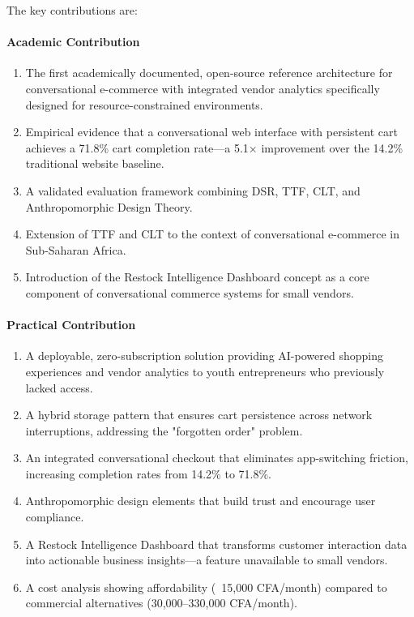 \documentclass[12pt,a4paper]{article}
\begin{document}
The key contributions are:

\paragraph{Academic Contribution}

\begin{enumerate}
    \item The first academically documented, open-source reference architecture for conversational e-commerce with integrated vendor analytics specifically designed for resource-constrained environments.
    \item Empirical evidence that a conversational web interface with persistent cart achieves a 71.8\% cart completion rate---a 5.1× improvement over the 14.2\% traditional website baseline.
    \item A validated evaluation framework combining DSR, TTF, CLT, and Anthropomorphic Design Theory.
    \item Extension of TTF and CLT to the context of conversational e-commerce in Sub-Saharan Africa.
    \item Introduction of the Restock Intelligence Dashboard concept as a core component of conversational commerce systems for small vendors.
\end{enumerate}

\paragraph{Practical Contribution}

\begin{enumerate}
    \item A deployable, zero-subscription solution providing AI-powered shopping experiences and vendor analytics to youth entrepreneurs who previously lacked access.
    \item A hybrid storage pattern that ensures cart persistence across network interruptions, addressing the "forgotten order" problem.
    \item An integrated conversational checkout that eliminates app-switching friction, increasing completion rates from 14.2\% to 71.8\%.
    \item Anthropomorphic design elements that build trust and encourage user compliance.
    \item A Restock Intelligence Dashboard that transforms customer interaction data into actionable business insights---a feature unavailable to small vendors.
    \item A cost analysis showing affordability (~15,000 CFA/month) compared to commercial alternatives (30,000--330,000 CFA/month).
\end{enumerate}
\end{document}
